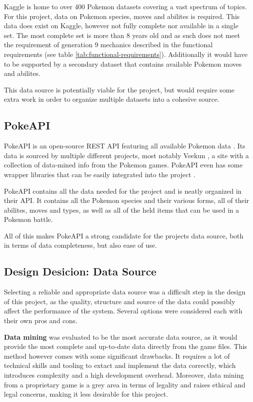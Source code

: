 Kaggle is home to over 400 Pokemon datasets \cite{PokemonKaggleDataSets} covering a vast spectrum of topics. For this project, data on Pokemon species,
moves and abilites is required. This data does exist on Kaggle, however not fully complete nor available in a single set. The most complete set \cite{PokemonDataSetWithStats} is 
more than 8 years old and as such does not meet the requirement of generation 9 mechanics described in the functional requirements (see table \ref{tab:functional-requirements}).
Additionally it would have to be supported by a secondary dataset that contains available Pokemon moves and abilites.

This data source is potentially viable for the project, but would require some extra work in order to organize multiple datasets into a cohesive source.

\subsection{PokeAPI}
PokeAPI is an open-source REST API featuring all available Pokemon data \cite{PokeAPI}. Its data is sourced by multiple different projects, most notably 
Veekun \cite{Veekun}, a site with a collection of data-mined info from the Pokemon games. PokeAPI even has some wrapper libraries that can be easily integrated
into the project \cite{PokeAPIWrapperLibs}. 

PokeAPI contains all the data needed for the project and is neatly organized in their API. It contains all the Pokemon species and their various forms, 
all of their abilites, moves and types, as well as all of the held items that can be used in a Pokemon battle. 

All of this makes PokeAPI a strong candidate for the projects data source, both in terms of data completeness, but also ease of use.


\subsection{Design Desicion: Data Source}
Selecting a reliable and appropriate data source was a difficult step in the design
of this project, as the quality, structure and source of the data could possibly 
affect the performance of the system. Several options were considered each with their
own pros and cons.

\textbf{Data mining} was evaluated to be the most accurate data source, as it would
provide the most complete and up-to-date data directly from the game files. This method
however comes with some significant drawbacks. It requires a lot of technical skills and tooling
to extact and implement the data correctly, which introduces complexity and a high development overhead.
Moreover, data mining from a proprietary game is a grey area in terms of legality and raises ethical 
and legal concerns, making it less desirable for this project.

